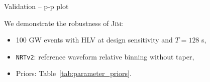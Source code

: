 \documentclass[usenames,dvipsnames,t]{beamer}
\begin{document}
\begin{frame}{Validation -- p-p plot}
  
  \def\x{1mm}
  \def\y{3mm}

  We demonstrate the robustness of \textsc{Jim}:

  \begin{itemize}
    \item 100 GW events with HLV at design sensitivity and $T = 128$ s,
    
    \vspace{\x}

    \item \texttt{NRTv2}: reference waveform relative binning without taper,
    
    \vspace{\x}
    
    \item Priors: Table~\ref{tab:parameter_priors}.
  \end{itemize}



\end{frame}
\end{document}
